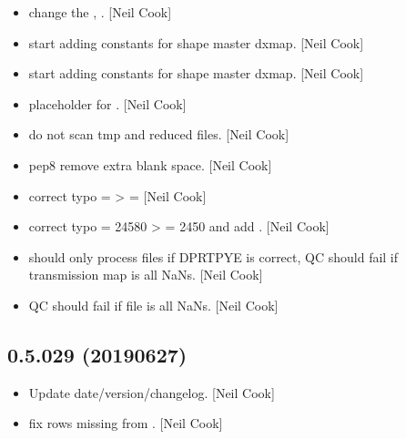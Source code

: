 \documentclass[a4paper,10pt,english]{report}
\begin{document}
\begin{itemize}
\item {} 
 \sphinxhyphen{} change the ,
. {[}Neil Cook{]}

\item {} 
 \sphinxhyphen{} start adding constants for shape master
dxmap. {[}Neil Cook{]}

\item {} 
 \sphinxhyphen{} start adding constants for shape master dxmap.
{[}Neil Cook{]}

\item {} 
 \sphinxhyphen{} placeholder for . {[}Neil
Cook{]}

\item {} 
 \sphinxhyphen{} do not scan tmp and reduced files. {[}Neil Cook{]}

\item {} 
 \sphinxhyphen{} pep8 \sphinxhyphen{} remove extra blank space. {[}Neil Cook{]}

\item {} 
 \sphinxhyphen{} correct typo  = 
\textendash{}\textgreater{}  =  {[}Neil Cook{]}

\item {} 
 \sphinxhyphen{} correct typo  = 24580 \textendash{}\textgreater{}
 = 2450 and add . {[}Neil
Cook{]}

\item {} 
  \sphinxhyphen{} should only process files if
DPRTPYE is correct, QC should fail if transmission map is all NaNs.
{[}Neil Cook{]}

\item {} 
 \sphinxhyphen{} QC should fail if file is all NaNs. {[}Neil
Cook{]}

\end{itemize}


\subsection{0.5.029 (2019\sphinxhyphen{}06\sphinxhyphen{}27)}
\label{\detokenize{misc/changelog:id126}}\begin{itemize}
\item {} 
Update date/version/changelog. {[}Neil Cook{]}

\item {} 
 \sphinxhyphen{} fix rows missing from . {[}Neil Cook{]}

\end{itemize}
\end{document}
